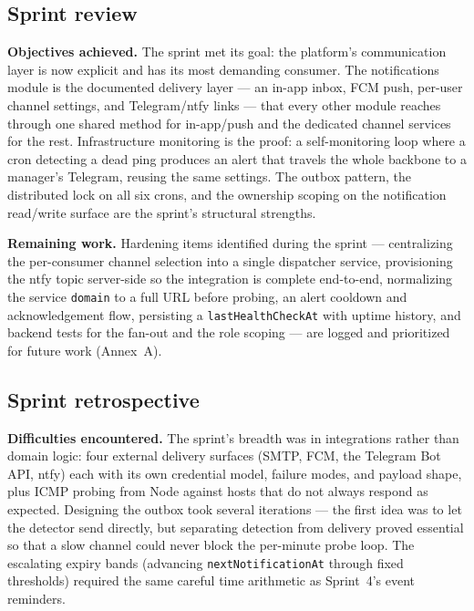 \subsection{Sprint review}

\textbf{Objectives achieved.} The sprint met its goal: the platform's communication layer is
now explicit and has its most demanding consumer. The notifications module is the documented
delivery layer --- an in-app inbox, FCM push, per-user channel settings, and Telegram/ntfy links ---
that every other module reaches through one shared method for in-app/push and the dedicated
channel services for the rest. Infrastructure monitoring is the proof: a self-monitoring loop
where a cron detecting a dead ping produces an alert that travels the whole backbone to a
manager's Telegram, reusing the same settings. The outbox pattern, the distributed lock on all
six crons, and the ownership scoping on the notification read/write surface are the sprint's
structural strengths.

\textbf{Remaining work.} Hardening items identified during the sprint --- centralizing the
per-consumer channel selection into a single dispatcher service, provisioning the ntfy topic
server-side so the integration is complete end-to-end, normalizing the service \texttt{domain} to
a full URL before probing, an alert cooldown and acknowledgement flow, persisting a
\texttt{lastHealthCheckAt} with uptime history, and backend tests for the fan-out and the
role scoping --- are logged and prioritized for future work (Annex~A).

\subsection{Sprint retrospective}

\textbf{Difficulties encountered.} The sprint's breadth was in integrations rather than domain
logic: four external delivery surfaces (SMTP, FCM, the Telegram Bot API, ntfy) each with its
own credential model, failure modes, and payload shape, plus ICMP probing from Node against
hosts that do not always respond as expected. Designing the outbox took several
iterations --- the first idea was to let the detector send directly, but separating detection
from delivery proved essential so that a slow channel could never block the per-minute probe
loop. The escalating expiry
bands (advancing \texttt{nextNotificationAt} through fixed thresholds) required the same
careful time arithmetic as Sprint~4's event reminders.

